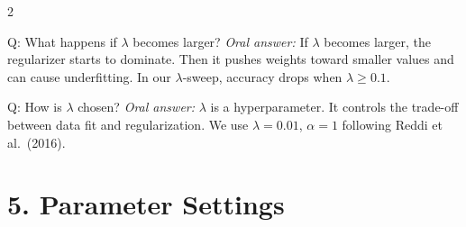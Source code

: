 \documentclass[a4paper,9pt]{article}
\newcommand{\oral}{\textit{\color{darkgray}Oral answer: }}
\begin{document}
\begin{multicols}{2}
\begin{qa}{Q: What happens if \(\lambda\) becomes larger?}
\oral If \(\lambda\) becomes larger, the regularizer starts to dominate. 
Then it pushes weights toward smaller values and can cause underfitting. 
In our \(\lambda\)-sweep, accuracy drops when \(\lambda \geq 0.1\).
\end{qa}

\begin{qa}{Q: How is \(\lambda\) chosen?}
\oral \(\lambda\) is a hyperparameter. 
It controls the trade-off between data fit and regularization. 
We use \(\lambda = 0.01\), \(\alpha = 1\) following Reddi et al.\ (2016).
\end{qa}

\section{5. Parameter Settings}


\end{multicols}
\end{document}
